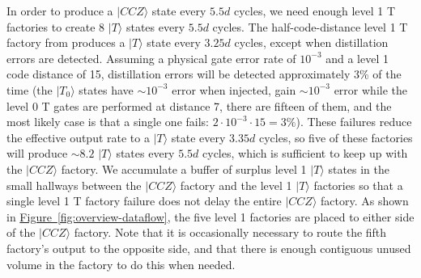 \documentclass[superscriptaddress,notitlepage,longbibliography]{revtex4-1}
\newcommand{\fig}[1]{\hyperref[fig:#1]{Figure~\ref*{fig:#1}}}
\begin{document}
In order to produce a $|CCZ\rangle$ state every $5.5d$ cycles, we need enough level 1 T factories to create 8 $|T\rangle$ states every $5.5d$ cycles.
The half-code-distance level 1 T factory from \cite{fowler2018} produces a $|T\rangle$ state every $3.25d$ cycles, except when distillation errors are detected.
Assuming a physical gate error rate of $10^{-3}$ and a level 1 code distance of 15, distillation errors will be detected approximately 3\% of the time (the $|T_0\rangle$ states have $\sim 10^{-3}$ error when injected, gain $\sim 10^{-3}$ error while the level 0 T gates are performed at distance 7, there are fifteen of them, and the most likely case is that a single one fails: $2 \cdot 10^{-3} \cdot 15 = 3\%$).
These failures reduce the effective output rate to a $|T\rangle$ state every $3.35d$ cycles, so five of these factories will produce $\sim 8.2$ $|T\rangle$ states every $5.5d$ cycles, which is sufficient to keep up with the $|CCZ\rangle$ factory.
We accumulate a buffer of surplus level 1 $|T\rangle$ states in the small hallways between the $|CCZ\rangle$ factory and the level 1 $|T\rangle$ factories so that a single level 1 T factory failure does not delay the entire $|CCZ\rangle$ factory.
As shown in \fig{overview-dataflow}, the five level 1 factories are placed to either side of the $|CCZ\rangle$ factory.
Note that it is occasionally necessary to route the fifth factory's output to the opposite side, and that there is enough contiguous unused volume in the factory to do this when needed.
\end{document}
